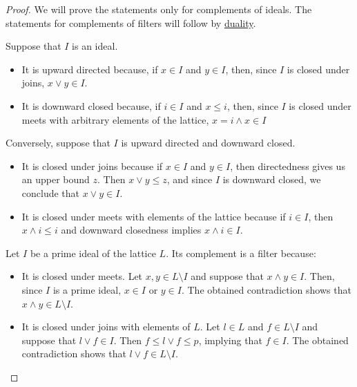\begin{proof}
  We will prove the statements only for complements of ideals. The statements for complements of filters will follow by \hyperref[def:semilattice/duality]{duality}.


  \SufficiencySubProof* Suppose that \( I \) is an ideal.

  \begin{itemize}
    \item It is upward directed because, if \( x \in I \) and \( y \in I \), then, since \( I \) is closed under joins, \( x \vee y \in I \).
    \item It is downward closed because, if \( i \in I \) and \( x \leq i \), then, since \( I \) is closed under meets with arbitrary elements of the lattice, \( x = i \wedge x \in I \)
  \end{itemize}

  \NecessitySubProof* Conversely, suppose that \( I \) is upward directed and downward closed.

  \begin{itemize}
    \item It is closed under joins because if \( x \in I \) and \( y \in I \), then directedness gives us an upper bound \( z \). Then \( x \vee y \leq z \), and since \( I \) is downward closed, we conclude that \( x \vee y \in I \).

    \item It is closed under meets with elements of the lattice because if \( i \in I \), then \( x \wedge i \leq i \) and downward closedness implies \( x \wedge i \in I \).
  \end{itemize}

   Let \( I \) be a prime ideal of the lattice \( L \). Its complement is a filter because:
  \begin{itemize}
    \item It is closed under meets. Let \( x, y \in L \setminus I \) and suppose that \( x \wedge y \in I \). Then, since \( I \) is a prime ideal, \( x \in I \) or \( y \in I \). The obtained contradiction shows that \( x \wedge y \in L \setminus I \).

    \item It is closed under joins with elements of \( L \). Let \( l \in L \) and \( f \in L \setminus I \) and suppose that \( l \vee f \in I \). Then \( f \leq l \vee f \leq p \), implying that \( f \in I \). The obtained contradiction shows that \( l \vee f \in L \setminus I \).
  \end{itemize}


\end{proof}

